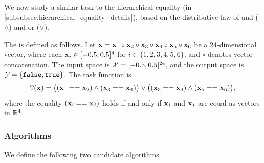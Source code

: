 We now study a similar task to the hierarchical equality (in \cref{subsubsec:hierarchical_equality_details}), based on the distributive law of and ($\land$) and or ($\lor$). 
\begin{task}\label{task:distributive_law}
    The  is defined as follows.
    Let $\mathbf{x} = \mathbf{x}_1 \circ \mathbf{x}_2 \circ \mathbf{x}_3 \circ \mathbf{x}_4 \circ \mathbf{x}_5 \circ \mathbf{x}_6$ be a 24-dimensional vector, where each $\mathbf{x}_i \in [-0.5, 0.5]^4$ for $i \in \{1,2,3,4,5,6\}$, and $\circ$ denotes vector concatenation. The input space is $\mathcal{X} = [-0.5, 0.5]^{24}$, and the output space is $\mathcal{Y} = \{\mathtt{false}, \mathtt{true}\}$. The task function is
    \begin{align}
        \mathtt{T}(\mathbf{x}) = \big((\mathbf{x}_1 == \mathbf{x}_2) \wedge (\mathbf{x}_3 == \mathbf{x}_4)\big) \vee \big((\mathbf{x}_3 == \mathbf{x}_4) \wedge (\mathbf{x}_5 == \mathbf{x}_6)\big),
    \end{align}
    where the equality $(\mathbf{x}_i == \mathbf{x}_j)$ holds if and only if $\mathbf{x}_i$ and $\mathbf{x}_j$ are equal as vectors in $\mathbb{R}^4$.
\end{task}

\subsubsection{Algorithms}\label{app:dl_algorithms}
We define the following two candidate algorithms.

